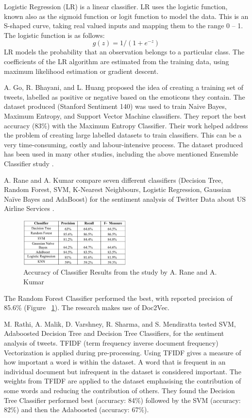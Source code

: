 Logistic Regression (LR) is a linear classifier. LR uses the logistic function, known also as the sigmoid function or logit function to model the data. This is an S-shaped curve, taking real valued inputs and mapping them to the range 0 – 1. The logistic function is as follows: \[g(z)=1/(1+e^{-z})\]
LR models the probability that an observation belongs to a particular class. The coefficients of the LR algorithm are estimated from the training data, using maximum likelihood estimation or gradient descent.

A. Go, R. Bhayani, and L. Huang \cite{Go2009} proposed the  idea of creating a training set of tweets, labelled as positive or negative based on the emoticons they contain. The dataset produced (Stanford Sentiment 140) was used to train Naive Bayes, Maximum Entropy, and Support Vector Machine classifiers. They report the best accuracy (83\%) with the Maximum Entropy Classifier. Their work helped address the problem of creating large labelled datasets to train classifiers. This can be a very time-consuming, costly and labour-intensive process. The dataset produced has been used in many other studies, including the above mentioned Ensemble Classifier study \cite{Ankit2018}.

A. Rane and A. Kumar compare seven different classifiers (Decision Tree, Random Forest, SVM, K-Nearest Neighbours, Logistic Regression, Gaussian Naïve Bayes and AdaBoost) for the sentiment analysis of Twitter Data about US Airline Services \cite{Rane2018}. 
\begin{figure}
    \centering
    \setlength{\belowcaptionskip}{-10pt}
    \includegraphics[width=0.5\textwidth]{literature_review/arane_classifier_results.PNG}
    \caption{Accuracy of Classifier Results from the study by A. Rane and A. Kumar \cite{Rane2018}}
    \label{fig:arane}
\end{figure}
The Random Forest Classifier performed the best, with reported precision of 85.6\% (Figure ~\ref{fig:arane}). The research makes use of Doc2Vec.

M. Rathi, A. Malik, D. Varshney, R. Sharma, and S. Mendiratta \cite{Raithi2018} tested SVM, Adaboosted Decision Tree and Decision Tree Classifiers, for the sentiment analysis of tweets. TFIDF (term frequency inverse document frequency) Vectorization is applied during pre-processing. Using TFIDF gives a measure of how important a word is within the dataset. A word that is frequent in an individual document but infrequent in the dataset is considered important. The weights from TFIDF are applied to the dataset emphasising the contribution of some words and reducing the contribution of others. They found the Decision Tree Classifier performed best  (accuracy: 84\%) followed by the SVM (accuracy: 82\%) and then the Adaboosted (accuracy: 67\%). 

